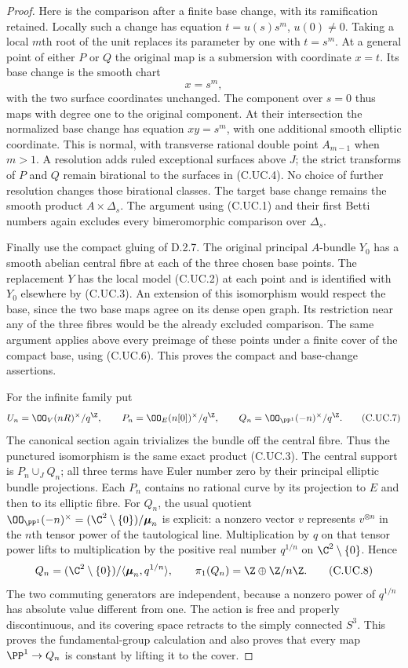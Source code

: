 \begin{proof}
Here is the comparison after a finite base
change, with its ramification retained.
Locally such a change has equation
$t=u(s)s^m$, $u(0)\ne0$. Taking a local
$m$th root of the unit replaces its
parameter by one with $t=s^m$.
At a general point of either $P$ or $Q$
the original map is a submersion with
coordinate $x=t$. Its base change is the
smooth chart
\[
                          x=s^m,
\tag{C.UC.6}
\]
with the two surface coordinates unchanged.
The component over $s=0$ thus maps with
degree one to the original component.
At their intersection the normalized base
change has equation $xy=s^m$, with one
additional smooth elliptic coordinate.
This is normal, with transverse rational
double point $A_{m-1}$ when $m>1$.
A resolution adds ruled exceptional
surfaces above $J$; the strict transforms
of $P$ and $Q$ remain birational to the
surfaces in (C.UC.4). No choice of further
resolution changes those birational
classes. The target base change remains
the smooth product $A\times\Delta_s$.
The argument using (C.UC.1) and their
first Betti numbers again excludes every
bimeromorphic comparison over $\Delta_s$.

Finally use the compact gluing of D.2.7.
The original principal $A$-bundle $Y_0$
has a smooth abelian central fibre at
each of the three chosen base points.
The replacement $Y$ has the local model
(C.UC.2) at each point and is identified
with $Y_0$ elsewhere by (C.UC.3).
An extension of this isomorphism would
respect the base, since the two base
maps agree on its dense open graph.
Its restriction near any of the three
fibres would be the already excluded
comparison. The same argument applies
above every preimage of these points
under a finite cover of the compact base,
using (C.UC.6). This proves the compact
and base-change assertions.

For the infinite family put
\[
 U_n=\OO_V(nR)^\times/q^{\Z},\qquad
 P_n=\OO_E(n[0])^\times/q^{\Z},\qquad
 Q_n=\OO_{\PP^1}(-n)^\times/q^{\Z}.
\tag{C.UC.7}
\]
The canonical section again trivializes the
bundle off the central fibre. Thus the punctured
isomorphism is the same exact product (C.UC.3).
The central support is $P_n\cup_J Q_n$;
all three terms have Euler number zero by their
principal elliptic bundle projections. Each
$P_n$ contains no rational curve by its
projection to $E$ and then to its elliptic
fibre. For $Q_n$, the usual quotient
$\OO_{\PP^1}(-n)^\times
=(\C^2\setminus\{0\})/\boldsymbol\mu_n$
is explicit: a nonzero vector $v$ represents
$v^{\otimes n}$ in the $n$th tensor power of
the tautological line. Multiplication by $q$
on that tensor power lifts to multiplication
by the positive real number $q^{1/n}$ on
$\C^2\setminus\{0\}$. Hence
\[
 Q_n=(\C^2\setminus\{0\})/
       \langle\boldsymbol\mu_n,q^{1/n}\rangle,
 \qquad
 \pi_1(Q_n)=\Z\oplus\Z/n\Z.
\tag{C.UC.8}
\]
The two commuting generators are independent,
because a nonzero power of $q^{1/n}$ has
absolute value different from one. The action
is free and properly discontinuous, and its
covering space retracts to the simply connected
$S^3$. This proves the fundamental-group
calculation and also proves that every map
$\PP^1\to Q_n$ is constant by lifting it to
the cover.


\end{proof}
